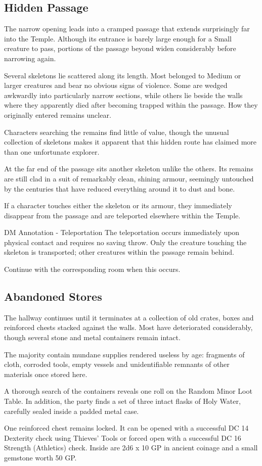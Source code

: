 \subsection*{ Hidden Passage}
{\entryfont The narrow opening leads into a cramped passage that extends surprisingly far into the Temple. Although its entrance is barely large enough for a Small creature to pass, portions of the passage beyond widen considerably before narrowing again.

Several skeletons lie scattered along its length. Most belonged to Medium or larger creatures and bear no obvious signs of violence. Some are wedged awkwardly into particularly narrow sections, while others lie beside the walls where they apparently died after becoming trapped within the passage. How they originally entered remains unclear.

Characters searching the remains find little of value, though the unusual collection of skeletons makes it apparent that this hidden route has claimed more than one unfortunate explorer.

At the far end of the passage sits another skeleton unlike the others. Its remains are still clad in a suit of remarkably clean, shining armour, seemingly untouched by the centuries that have reduced everything around it to dust and bone.

If a character touches either the skeleton or its armour, they immediately disappear from the passage and are teleported elsewhere within the Temple.}

\begingroup
	\DndSetThemeColor[PhbTan]
	\begin{DndComment}{DM Annotation - Teleportation}
		The teleportation occurs immediately upon physical contact and requires no saving throw. Only the creature touching the skeleton is transported; other creatures within the passage remain behind.

Continue with the corresponding room when this occurs.
	\end{DndComment}
\endgroup

\subsection*{ Abandoned Stores}
{\entryfont The hallway continues until it terminates at a collection of old crates, boxes and reinforced chests stacked against the walls. Most have deteriorated considerably, though several stone and metal containers remain intact.

The majority contain mundane supplies rendered useless by age: fragments of cloth, corroded tools, empty vessels and unidentifiable remnants of other materials once stored here.

A thorough search of the containers reveals one roll on the Random Minor Loot Table. In addition, the party finds a set of three intact flasks of Holy Water, carefully sealed inside a padded metal case.

One reinforced chest remains locked. It can be opened with a successful DC 14 Dexterity check using Thieves' Tools or forced open with a successful DC 16 Strength (Athletics) check. Inside are 2d6 x 10 GP in ancient coinage and a small gemstone worth 50 GP.}

